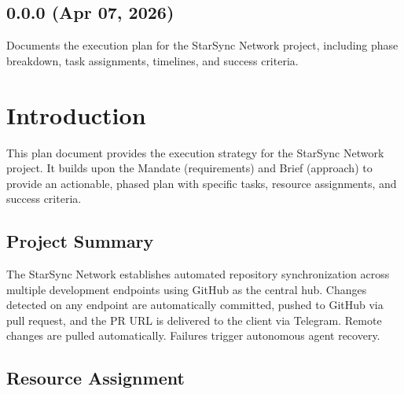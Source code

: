 \documentclass[letterpaper,10pt,openany,oneside,english]{sphinxmanual}
\begin{document}
\subsection{0.0.0 (Apr 07, 2026)}
\label{\detokenize{releasenotes:apr-07-2026}}
\sphinxAtStartPar
{}

\sphinxAtStartPar
Documents the execution plan for the StarSync Network project, including phase
breakdown, task assignments, timelines, and success criteria.

\sphinxstepscope


\section{Introduction}
\label{\detokenize{introduction:introduction}}\label{\detokenize{introduction::doc}}
\sphinxAtStartPar
This plan document provides the execution strategy for the StarSync Network
project. It builds upon the Mandate (requirements) and Brief (approach) to
provide an actionable, phased plan with specific tasks, resource assignments,
and success criteria.


\subsection{Project Summary}
\label{\detokenize{introduction:project-summary}}
\sphinxAtStartPar
The StarSync Network establishes automated repository synchronization across
multiple development endpoints using GitHub as the central hub. Changes
detected on any endpoint are automatically committed, pushed to GitHub via
pull request, and the PR URL is delivered to the client via Telegram. Remote
changes are pulled automatically. Failures trigger autonomous agent recovery.


\subsection{Resource Assignment}
\label{\detokenize{introduction:resource-assignment}}
\end{document}
